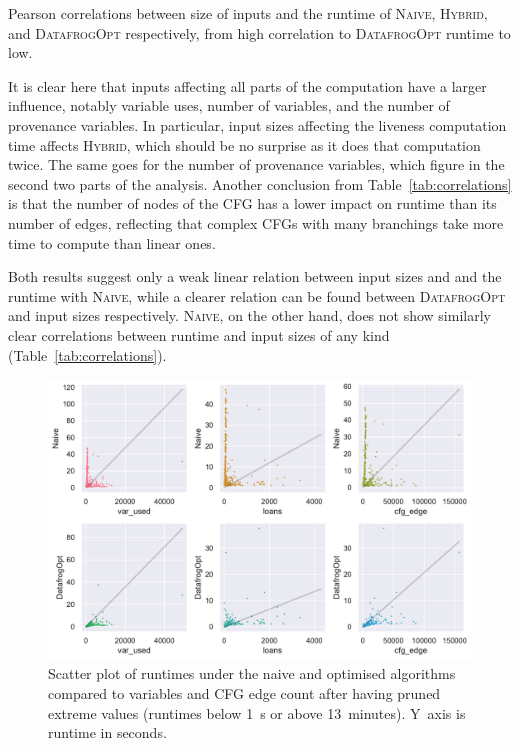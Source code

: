 \documentclass[11pt,a4paper,twoside,openany,draft]{report}
\begin{document}
\begin{table}[ht]
  
  \caption[Pearson Correlations Between Sizes of Inputs and Runtime]{Pearson
    correlations between size of inputs and the runtime of \textsc{Naive},
    \textsc{Hybrid}, and \textsc{DatafrogOpt} respectively, from high
    correlation to \textsc{DatafrogOpt} runtime to low.}
  \label{tab:correlations}
\end{table}%

It is clear here that inputs affecting all parts of the computation have a
larger influence, notably variable uses, number of variables, and the number of
provenance variables. In particular, input sizes affecting the liveness
computation time affects \textsc{Hybrid}, which should be no surprise as it does
that computation twice. The same goes for the number of provenance variables,
which figure in the second two parts of the analysis. Another conclusion from
Table~\ref{tab:correlations} is that the number of nodes of the CFG has a lower
impact on runtime than its number of edges, reflecting that complex CFGs with
many branchings take more time to compute than linear ones.

Both results suggest only a weak linear relation between input sizes and
and the runtime with \textsc{Naive}, while a clearer relation can be
found between \textsc{DatafrogOpt} and input sizes respectively. \textsc{Naive},
on the other hand, does not show similarly clear correlations between runtime
and input sizes of any kind (Table~\ref{tab:correlations}).

\begin{figure}
  \includegraphics[width=0.9\linewidth]{Graphs/corr_scatter.pdf}
  \caption[Scatter Plot of Runtimes On Two Polonius Variants vs. nr. of CFG
  Edges and Variables]{Scatter plot of runtimes under the naive and optimised
    algorithms compared to variables and CFG edge count after having pruned
    extreme values (runtimes below 1~s or above 13~minutes). Y~axis is runtime
    in seconds.}
  \label{fig:input-scatter}
\end{figure}
\end{document}
